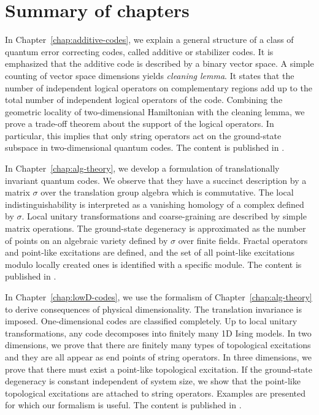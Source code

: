 \section{Summary of chapters}


In Chapter~\ref{chap:additive-codes}, we explain a general structure of a class of quantum error correcting codes, called additive or stabilizer codes. It is emphasized that the additive code is described by a binary vector space. A simple counting of vector space dimensions yields {\em cleaning lemma}. It states that the number of independent logical operators on complementary regions add up to the total number of independent logical operators of the code. Combining the geometric locality of two-dimensional Hamiltonian with the cleaning lemma, we prove a trade-off theorem about the support of the logical operators. In particular, this implies that only string operators act on the ground-state subspace in two-dimensional quantum codes. 
The content is published in \cite{HaahPreskill2012tradeoff}.


In Chapter~\ref{chap:alg-theory}, we develop a formulation of translationally invariant quantum codes. We observe that they have a succinct description by a matrix $\sigma$ over the translation group algebra which is commutative. The local indistinguishability is interpreted as a vanishing homology of a complex defined by $\sigma$. Local unitary transformations and coarse-graining are described by simple matrix operations. The ground-state degeneracy is approximated as the number of points on an algebraic variety defined by $\sigma$ over finite fields. Fractal operators and point-like excitations are defined, and the set of all point-like excitations modulo locally created ones is identified with a specific module.
The content is published in \cite{Haah2012PauliModule}.


In Chapter~\ref{chap:lowD-codes}, we use the formalism of Chapter~\ref{chap:alg-theory} to derive consequences of physical dimensionality. The translation invariance is imposed. One-dimensional codes are classified completely. Up to local unitary transformations, any code decomposes into finitely many 1D Ising models. In two dimensions, we prove that there are finitely many types of topological excitations and they are all appear as end points of string operators.
In three dimensions, we prove that there must exist a point-like topological excitation. If the ground-state degeneracy is constant independent of system size, we show that the point-like topological excitations are attached to string operators. Examples are presented for which our formalism is useful.
The content is published in \cite{Haah2012PauliModule}.



